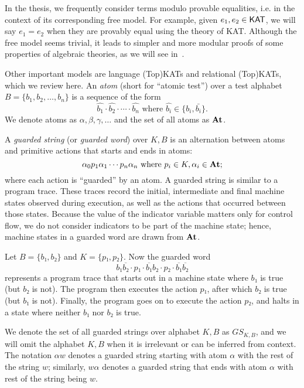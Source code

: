 In the thesis, we frequently consider terms modulo provable equalities, i.e. in the
context of its corresponding free model.  For example, given \(e_1, e_2  \in  \mathsf{KAT}\),
we will say \(e_1 = e_2\) when they are provably equal using the theory of KAT.
Although the free model seems trivial, it leads to simpler and more modular
proofs of some properties of algebraic theories, as we will see in~.

Other important models are language (Top)KATs and relational (Top)KATs, which we review here.  
An \emph{atom} (short for ``atomic test'') over a test alphabet \(B = \{b_{1}, b_{2},  … , b_{n}\}\) is a sequence of the form
\[\hat{b_{1}}  \cdot  \hat{b_{2}}  \cdot   \cdots   \cdot \hat{b_{n}} \text{ where } \hat{b_{i}}  \in  \{b_{i}, \bar{b_{i}}\}.\] 
We denote atoms as \( α ,  β ,  γ ,  … \) and the set of all atoms as \(\mathbf{At}\).

A \emph{guarded string} (or \emph{guarded word}) over \(K, B\) is an alternation 
between atoms and primitive actions that starts and ends in atoms: 
\[ \alpha _{0}p_{1} \alpha _{1}  \cdots  p_{n}  \alpha _{n} \text{ where } p_{i}  \in  K,  \alpha _{i}  \in  \mathbf{At};\] 
where each action is ``guarded'' by an atom.
A guarded string is similar to a program trace. These traces record the initial, intermediate and final machine states observed during execution, as well as the actions that occurred between those states. %
Because the value of the indicator variable matters only for control flow, we do not consider indicators to be part of the machine state; hence, machine states in a guarded word are drawn from $\mathbf{At}$.

\begin{example} 
    Let $B = \{ b₁, b₂ \}$ and $K = \{ p₁, p₂ \}$.
    Now the guarded word \[b₁ \overline{b₂} ⋅ p₁ ⋅ \overline{b₁} b₂ ⋅ p₂ ⋅ \overline{b₁} \overline{b₂}\] represents a program trace that starts out in a machine state where $b₁$ is true (but $b₂$ is not).
    The program then executes the action $p₁$, after which $b₂$ is true (but $b₁$ is not).
    Finally, the program goes on to execute the action $p₂$, and halts in a state where neither $b₁$ nor $b₂$ is true.
\end{example}

We denote the set of all guarded
strings over alphabet \(K, B\) as \(GS_{K, B}\), and we will omit the alphabet
\(K, B\) when it is irrelevant or can be inferred from context.  The notation
\( α  w\) denotes a guarded string starting with atom \( α \) with the rest of the string
\(w\); similarly, \(w  α \) denotes a guarded string that ends with atom \( α \) with
rest of the string being \(w\).

